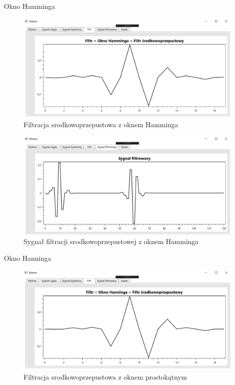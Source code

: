 \documentclass[12pt]{article}
\begin{document}
\newpage
Okno Hamminga
\begin{figure}[h!]
 \centering
 \includegraphics[width=12.3cm]{prostFSOHm.PNG}
 \vspace{-0.3cm}
 \caption{Filtracja srodkowoprzepustowa z oknem Hamminga}
 \label{fsohm}
\end{figure}

\newpage
\begin{figure}[h!]
 \centering
 \includegraphics[width=12.3cm]{prostSFSHm.PNG}
 \vspace{-0.3cm}
 \caption{Sygnał filtracji srodkowoprzepustowej z oknem Hamminga}
 \label{sfshm}
\end{figure}

Okno Hanninga
\begin{figure}[h!]
 \centering
 \includegraphics[width=12.3cm]{prostFSOHn.PNG}
 \vspace{-0.3cm}
 \caption{Filtracja srodkowoprzepustowa z oknem prostokątnym}
 \label{Wykres dla wyników eksperymentu drugiego}
\end{figure}
\end{document}
